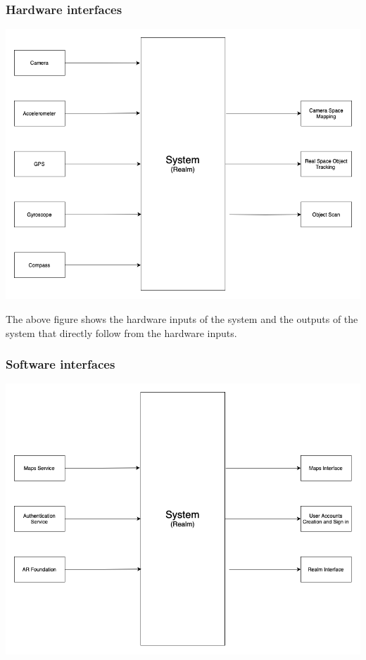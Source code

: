 \documentclass{article}
\begin{document}
\subsubsection{Hardware interfaces}

\begin{center}
    \includegraphics[scale=0.4]{OtherDiagrams/hscd.png}
\end{center}

The above figure shows the hardware inputs of the system and the outputs of the system that directly follow from the hardware inputs.


\subsubsection{Software interfaces}

\begin{center}
    \includegraphics[scale=0.4]{OtherDiagrams/sscd.png}
\end{center}
\end{document}
